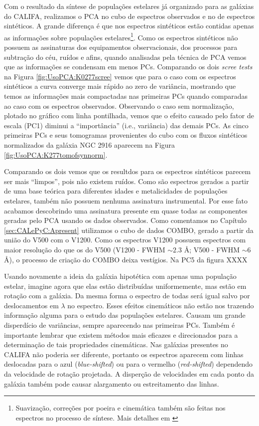 Com o resultado da síntese de populações estelares já organizado para as galáxias do CALIFA, realizamos o PCA no cubo de
espectros observados e no de espectros sintéticos. A grande diferença é que nos espectros sintéticos estão contidas
apenas as informações sobre populações estelares\footnote{Suavização, correções por poeira e cinemática também são
feitas nos espectros no processo de síntese. Mais detalhes em \citet{CidFernandes2005}}. Como os espectros sintéticos
não possuem as assinaturas dos equipamentos observacionais, dos processos para subtração do céu, ruídos e afins, quando
analisadas pela técnica de PCA vemos que as informações se condensam em menos PCs. Comparando os dois {\em scree tests}
na Figura \ref{fig:UsoPCA:K0277scree} vemos que para o caso com os espectros sintéticos a curva converge mais rápido ao
zero de variância, mostrando que temos as informações mais compactadas nas primeiras PCs quando comparadas ao caso com
os espectros observados. Observando o caso sem normalização, plotado no gráfico com linha pontilhada, vemos que o efeito
causado pelo fator de escala (PC1) diminui a ``importância'' (i.e., variância) das demais PCs. As cinco primeiras PCs e
seus tomogramas provenientes do cubo com os fluxos sintéticos normalizados da galáxia NGC 2916 aparecem na Figura
\ref{fig:UsoPCA:K277tomofsynnorm}.

Comparando os dois vemos que os resultdos para os espectros sintéticos parecem ser mais ``limpos'', pois não existem
ruídos. Como são espectros gerados a partir de uma base teórica para diferentes idades e metalicidades de populações
estelares, também não possuem nenhuma assinatura instrumental. Por esse fato acabamos descobrindo uma assinatura
presente em quase todas as componentes geradas pelo PCA usando os dados observados. Como comentamos no Capítulo
\ref{sec:CALePyC:Apresent} utilizamos o cubo de dados COMBO, gerado a partir da união do V500 com o V1200. Como os
espectros V1200 possuem espectros com maior resolução do que os do V500 (V1200 - FWHM $\sim 2.3$ \AA; V500 - FWHM $\sim
6$ \AA), o processo de criação do COMBO deixa vestígios. Na PC5 da figura XXXX 

Usando novamente a ideia da galáxia hipotética com apenas uma população estelar, imagine agora que elas estão
distribuídas uniformemente, mas estão em rotação com a galáxia. Da mesma forma o espectro de todas será igual salvo por
deslocamentos em $\lambda$ no espectro. Esses efeitos cinemáticos não estão nos trazendo informação alguma para o estudo
das populações estelares. Causam um grande disperdício de variâncias, sempre aparecendo nas primeiras PCs. Também é
importante lembrar que existem métodos mais eficazes e direcionados para a determinação de tais propriedades
cinemáticas. Nas galáxias presentes no CALIFA não poderia ser diferente, portanto os espectros aparecem com linhas
deslocadas para o azul ({\em blue-shifted}) ou para o vermelho ({\em red-shifted}) dependendo da velocidade de rotação
projetada. A disperção de velocidades em cada ponto da galáxia também pode causar alargamento ou estreitamento das
linhas.

